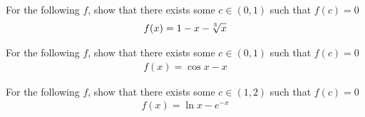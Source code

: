 \begin{exercise}
For the following $f$, show that there exists some $c \in (0, 1)$ such that $f(c)=0$
\begin{align*}
    f(x) = 1 - x - \sqrt[\leftroot{2}\uproot{2}3]{x}
\end{align*}
\end{exercise}

\begin{exercise}
For the following $f$, show that there exists some $c \in (0, 1)$ such that $f(c)=0$
\begin{align*}
    f(x) = \cos x - x
\end{align*}
\end{exercise}

\begin{exercise}
For the following $f$, show that there exists some $c \in (1, 2)$ such that $f(c)=0$
\begin{align*}
    f(x) = \ln x - e^{-x}
\end{align*}
\end{exercise}

